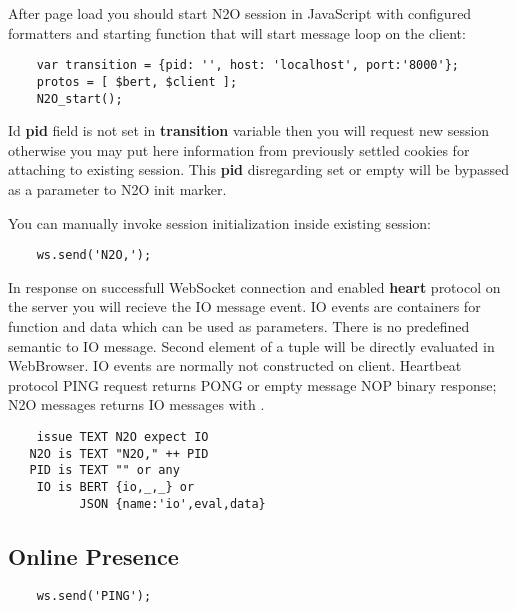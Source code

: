 After page load you should start N2O session in JavaScript with configured
formatters and starting function that will start message loop on the client:

\vspace{1\baselineskip}
\begin{lstlisting}
    var transition = {pid: '', host: 'localhost', port:'8000'};
    protos = [ $bert, $client ];
    N2O_start();
\end{lstlisting}
\vspace{1\baselineskip}

Id {\bf pid} field is not set in {\bf transition} variable then you
will request new session otherwise you may put here information from
previously settled cookies for attaching to existing session. This {\bf pid}
disregarding set or empty will be bypassed as a parameter to N2O init marker.

\newpage
You can manually invoke session initialization inside existing session:

\vspace{1\baselineskip}
\begin{lstlisting}
    ws.send('N2O,');
\end{lstlisting}
\vspace{1\baselineskip}

In response on successfull WebSocket connection and enabled {\bf heart}
protocol on the server you will recieve the IO message event.
IO events are containers for function and data which can be used as parameters.
There is no predefined semantic to IO message. Second element of a tuple
will be directly evaluated in WebBrowser. IO events are normally not
constructed on client. Heartbeat protocol PING request returns PONG
or empty message NOP binary response; N2O messages returns IO messages
with .

\vspace{1\baselineskip}
\begin{lstlisting}
    issue TEXT N2O expect IO
   N2O is TEXT "N2O," ++ PID
   PID is TEXT "" or any
    IO is BERT {io,_,_} or
          JSON {name:'io',eval,data}
\end{lstlisting}
\vspace{1\baselineskip}

\subsection*{Online Presence}

\vspace{1\baselineskip}
\begin{lstlisting}
    ws.send('PING');
\end{lstlisting}
\vspace{1\baselineskip}

